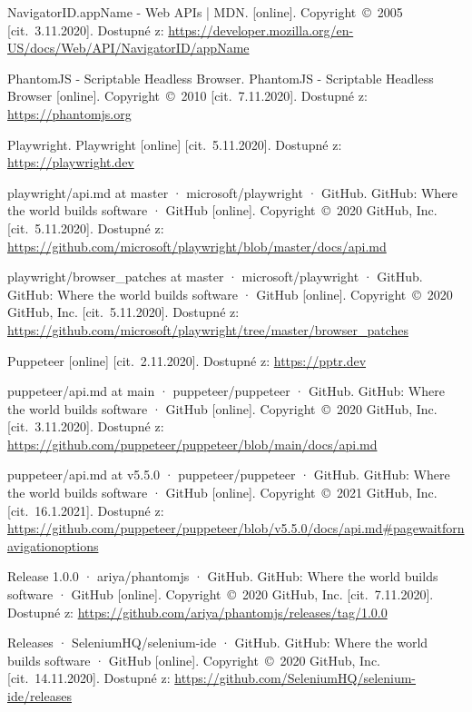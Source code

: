 \begin{thebibliography}{99}
 NavigatorID.appName - Web APIs | MDN. [online]. Copyright~©~2005 [cit.~3.11.2020]. Dostupné z: \url{https://developer.mozilla.org/en-US/docs/Web/API/NavigatorID/appName}

 PhantomJS - Scriptable Headless Browser. PhantomJS - Scriptable Headless Browser [online]. Copyright~©~2010 [cit.~7.11.2020]. Dostupné z: \url{https://phantomjs.org}

 Playwright. Playwright [online] [cit.~5.11.2020]. Dostupné z: \url{https://playwright.dev}

 playwright/api.md at master · microsoft/playwright · GitHub. GitHub: Where the world builds software · GitHub [online]. Copyright~©~2020 GitHub, Inc. [cit.~5.11.2020]. Dostupné z: \url{https://github.com/microsoft/playwright/blob/master/docs/api.md}

 playwright/browser\_patches at master · microsoft/playwright · GitHub. GitHub: Where the world builds software · GitHub [online]. Copyright~©~2020 GitHub, Inc. [cit.~5.11.2020]. Dostupné z: \url{https://github.com/microsoft/playwright/tree/master/browser_patches}

 Puppeteer [online] [cit.~2.11.2020]. Dostupné z: \url{https://pptr.dev}

\newpage

 puppeteer/api.md at main · puppeteer/puppeteer · GitHub. GitHub: Where the world builds software · GitHub [online]. Copyright~©~2020 GitHub, Inc. [cit.~3.11.2020]. Dostupné z: \url{https://github.com/puppeteer/puppeteer/blob/main/docs/api.md}

 puppeteer/api.md at v5.5.0 · puppeteer/puppeteer · GitHub. GitHub: Where the world builds software · GitHub [online]. Copyright~©~2021 GitHub, Inc. [cit.~16.1.2021]. Dostupné z: \url{https://github.com/puppeteer/puppeteer/blob/v5.5.0/docs/api.md#pagewaitfornavigationoptions}

 Release 1.0.0 · ariya/phantomjs · GitHub. GitHub: Where the world builds software · GitHub [online]. Copyright~©~2020 GitHub, Inc. [cit.~7.11.2020]. Dostupné z: \url{https://github.com/ariya/phantomjs/releases/tag/1.0.0}

 Releases · SeleniumHQ/selenium-ide · GitHub. GitHub: Where the world builds software · GitHub [online]. Copyright~©~2020 GitHub, Inc. [cit.~14.11.2020]. Dostupné z: \url{https://github.com/SeleniumHQ/selenium-ide/releases}


\end{thebibliography}
